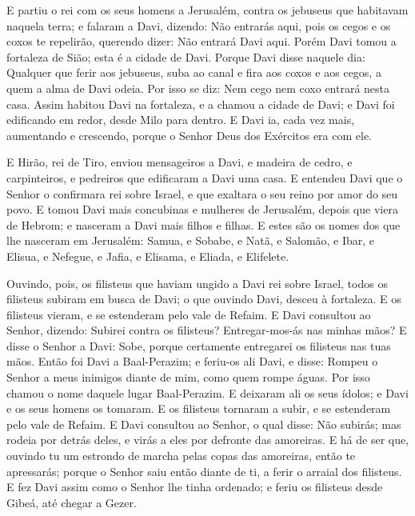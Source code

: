 E partiu o rei com os seus homens a Jerusalém, contra os jebuseus
que habitavam naquela terra; e falaram a Davi, dizendo: Não entrarás
aqui, pois os cegos e os coxos te repelirão, querendo dizer: Não
entrará Davi aqui. Porém Davi tomou a fortaleza de Sião; esta é
a cidade de Davi. Porque Davi disse naquele dia: Qualquer que
ferir aos jebuseus, suba ao canal e fira aos coxos e aos cegos, a
quem a alma de Davi odeia. Por isso se diz: Nem cego nem coxo
entrará nesta casa. Assim habitou Davi na fortaleza, e a chamou
a cidade de Davi; e Davi foi edificando em redor, desde Milo para
dentro. E Davi ia, cada vez mais, aumentando e crescendo,
porque o Senhor Deus dos Exércitos era com ele.

E Hirão, rei de Tiro, enviou mensageiros a Davi, e madeira de
cedro, e carpinteiros, e pedreiros que edificaram a Davi uma casa.
E entendeu Davi que o Senhor o confirmara rei sobre Israel, e
que exaltara o seu reino por amor do seu povo. E tomou Davi
mais concubinas e mulheres de Jerusalém, depois que viera de Hebrom;
e nasceram a Davi mais filhos e filhas. E estes são os nomes
dos que lhe nasceram em Jerusalém: Samua, e Sobabe, e Natã, e
Salomão, e Ibar, e Elisua, e Nefegue, e Jafia, e
Elisama, e Eliada, e Elifelete.

Ouvindo, pois, os filisteus que haviam ungido a Davi rei sobre
Israel, todos os filisteus subiram em busca de Davi; o que ouvindo
Davi, desceu à fortaleza. E os filisteus vieram, e se
estenderam pelo vale de Refaim. E Davi consultou ao Senhor,
dizendo: Subirei contra os filisteus? Entregar-mos-ás nas minhas
mãos? E disse o Senhor a Davi: Sobe, porque certamente entregarei os
filisteus nas tuas mãos. Então foi Davi a Baal-Perazim; e
feriu-os ali Davi, e disse: Rompeu o Senhor a meus inimigos diante
de mim, como quem rompe águas. Por isso chamou o nome daquele lugar
Baal-Perazim. E deixaram ali os seus ídolos; e Davi e os seus
homens os tomaram. E os filisteus tornaram a subir, e se
estenderam pelo vale de Refaim. E Davi consultou ao Senhor, o
qual disse: Não subirás; mas rodeia por detrás deles, e virás a eles
por defronte das amoreiras. E há de ser que, ouvindo tu um
estrondo de marcha pelas copas das amoreiras, então te apressarás;
porque o Senhor saiu então diante de ti, a ferir o arraial dos
filisteus. E fez Davi assim como o Senhor lhe tinha ordenado;
e feriu os filisteus desde Gibeá, até chegar a Gezer.

\medskip

